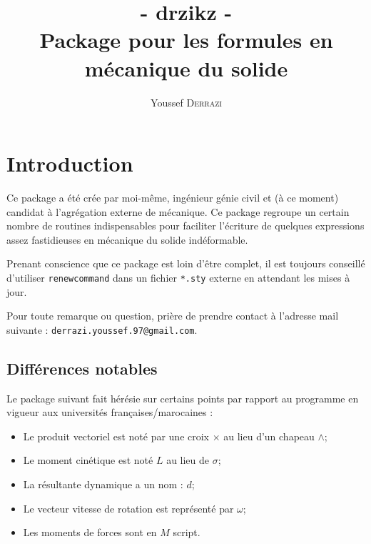 \documentclass[12pt]{article}
\begin{document}

\title{- drzikz -\\Package pour les formules en mécanique du solide}
\author{Youssef \textsc{Derrazi}}
\maketitle

\tableofcontents
\newpage
{}

\section{Introduction}
Ce package a été crée par moi-même, ingénieur génie civil et (à ce moment) candidat à l'agrégation externe de mécanique. Ce package regroupe un certain nombre de routines indispensables pour faciliter l'écriture de quelques expressions assez fastidieuses en mécanique du solide indéformable.
\vspace{12pt}

Prenant conscience que ce package est loin d'être complet, il est toujours conseillé d'utiliser \verb|renewcommand| dans un fichier \verb|*.sty| externe en attendant les mises à jour.
\vspace{12pt}

Pour toute remarque ou question, prière de prendre contact à l'adresse mail suivante : \verb|derrazi.youssef.97@gmail.com|.

\subsection{Différences notables}
Le package suivant fait hérésie sur certains points par rapport au programme en vigueur aux universités françaises/marocaines :

\begin{itemize}
\item Le produit vectoriel est noté par une croix $\times$ au lieu d'un chapeau $\wedge$;
\item Le moment cinétique est noté $L$ au lieu de $\sigma$;
\item La résultante dynamique a un nom : $d$;
\item Le vecteur vitesse de rotation est représenté par $\omega$;
\item Les moments de forces sont en $M$ script.
\end{itemize}
\end{document}
